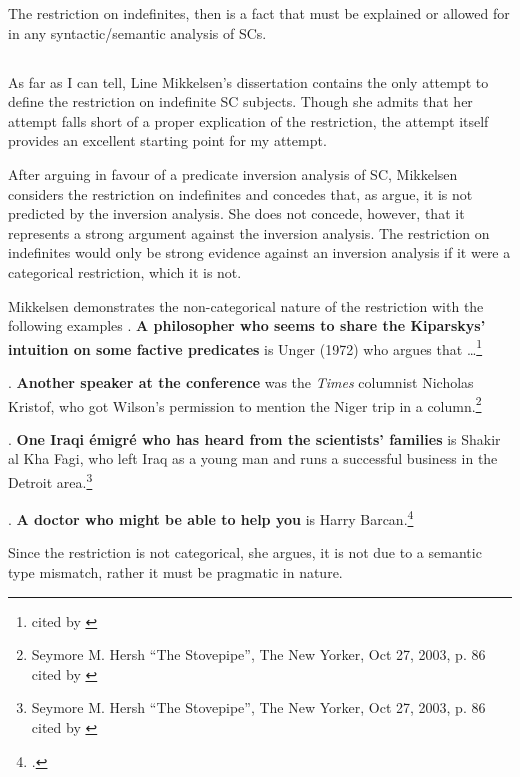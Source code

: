 \documentclass[GPFinal]{subfiles}
\begin{document}
The restriction on indefinites, then is a fact that must be explained or allowed for in any syntactic/semantic analysis of SCs.

\subsection{\textcite{mikkelsen2004specifying}}
As far as I can tell, Line Mikkelsen's dissertation contains the only attempt to define the restriction on indefinite SC subjects.
Though she admits that her attempt falls short of a proper explication of the restriction, the attempt itself provides an excellent starting point for my attempt.

After arguing in favour of a predicate inversion analysis of SC, Mikkelsen considers the restriction on indefinites and concedes that, as \textcite{heycockkroch1999pseudocleft} argue, it is not predicted by the inversion analysis.
She does not concede, however, that it represents a strong argument against the inversion analysis.
The restriction on indefinites would only be strong evidence against an inversion analysis if it were a categorical restriction, which it is not.

Mikkelsen demonstrates the non-categorical nature of the restriction with the following examples
\ex.\label{ex:MikkPhilosopher} \textbf{A philosopher who seems to share the Kiparskys' intuition on some factive predicates} is Unger (1972) who argues that \dots\footnote{\textcite[][p. 195 fn8]{delacruz1976factives} cited by \textcite{mikkelsen2004specifying}}

\ex.\label{ex:MikkSpeaker} \textbf{Another speaker at the conference} was the \textit{Times} columnist Nicholas Kristof, who got Wilson's permission to mention the Niger trip in a column.\footnote{Seymore M. Hersh ``The Stovepipe'', The New Yorker, Oct 27, 2003, p. 86 cited by \textcite{mikkelsen2004specifying}}

\ex.\label{ex:MikkEmigre} \textbf{One Iraqi \'emigr\'e who has heard from the scientists' families} is Shakir al Kha Fagi, who left Iraq as a young man and runs a successful business in the Detroit area.\footnote{Seymore M. Hersh ``The Stovepipe'', The New Yorker, Oct 27, 2003, p. 86 cited by \textcite{mikkelsen2004specifying}}

\ex.\label{ex:MikkBarcan} \textbf{A doctor who might be able to help you} is Harry Barcan.\footcite{mikkelsen2004specifying}

Since the restriction is not categorical, she argues, it is not due to a semantic type mismatch, rather it must be pragmatic in nature.
\end{document}

